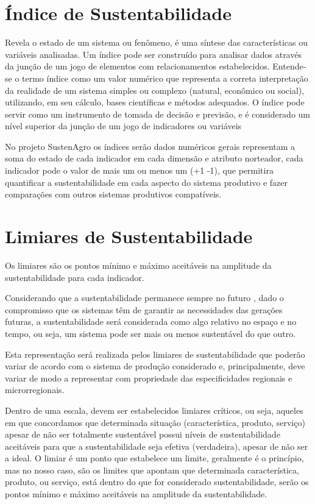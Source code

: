 
\section{Índice de Sustentabilidade}

Revela o estado de um sistema ou fenômeno, é uma síntese das características
ou variáveis analisadas. Um índice pode ser construído para analisar
dados através da junção de um jogo de elementos com relacionamentos
estabelecidos. Entende-se o termo índice como um valor numérico que
representa a correta interpretação da realidade de um sistema simples
ou complexo (natural, econômico ou social), utilizando, em seu cálculo,
bases científicas e métodos adequados. O índice pode servir como um
instrumento de tomada de decisão e previsão, e é considerado um nível
superior da junção de um jogo de indicadores ou variáveis \citep{SicheAgostinho2007}

No projeto SustenAgro os índices serão dados numéricos gerais representam
a soma do estado de cada indicador em cada dimensão e atributo norteador,
cada indicador pode o valor de mais um ou menos um (+1 -1), que permitira
quantificar a sustentabilidade em cada aspecto do sistema produtivo
e fazer comparações com outros sistemas produtivos compatíveis.

\section{Limiares de Sustentabilidade}

Os limiares são os pontos mínimo e máximo aceitáveis na amplitude
da sustentabilidade para cada indicador.

Considerando que a sustentabilidade permanece sempre no futuro \citep{gliessman2001agroecologia},
dado o compromisso que os sistemas têm de garantir as necessidades
das gerações futuras, a sustentabilidade será considerada como algo
relativo no espaço e no tempo, ou seja, um sistema pode ser mais ou
menos sustentável do que outro.

Esta representação será realizada pelos limiares de sustentabilidade
que poderão variar de acordo com o sistema de produção considerado
e, principalmente, deve variar de modo a representar com propriedade
das especificidades regionais e microrregionais.

Dentro de uma escala, devem ser estabelecidos limiares críticos, ou
seja, aqueles em que concordamos que determinada situação (característica,
produto, serviço) apesar de não ser totalmente sustentável possui
níveis de sustentabilidade aceitáveis para que a sustentabilidade
seja efetiva (verdadeira), apesar de não ser a ideal. O limiar é um
ponto que estabelece um limite, geralmente é o princípio, mas no nosso
caso, são os limites que apontam que determinada característica, produto,
ou serviço, está dentro do que for considerado sustentabilidade, serão
os pontos mínimo e máximo aceitáveis na amplitude da sustentabilidade.

